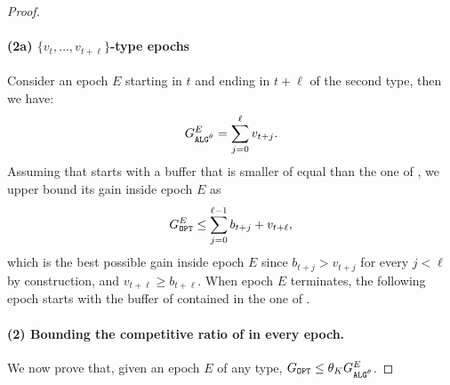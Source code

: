 \begin{proof}
    \paragraph{(2a) $\{v_t, \ldots, v_{t+\ell}\}$-type epochs} Consider an epoch $E$ starting in $t$ and ending in $t+\ell$ of the second type, then we have:
    \begin{align*}
        \Galgtheta^E = \sum_{j=0}^{\ell} v_{t+j}.
    \end{align*}
    Assuming that \opt starts with a buffer that is smaller of equal than the one of \algtheta, we upper bound its gain inside epoch $E$ as
    \begin{align}
    \label{eq:gopt_bound_ii}
        \Gopt^E \le \sum_{j=0}^{\ell-1} b_{t+j} + v_{t+\ell},
    \end{align}
    which is the best possible gain inside epoch $E$ since $b_{t+j}>v_{t+j}$ for every $j<\ell$ by construction, and $v_{t+\ell}\ge b_{t+\ell}$. When epoch $E$ terminates, the following epoch starts with the buffer of \opt contained in the one of \algtheta. 
    \paragraph{(2) Bounding the competitive ratio of \algtheta in every epoch.} We now prove that, given an epoch $E$ of any type, $\Gopt \le \theta_K\Galgtheta^E$.

\end{proof}
